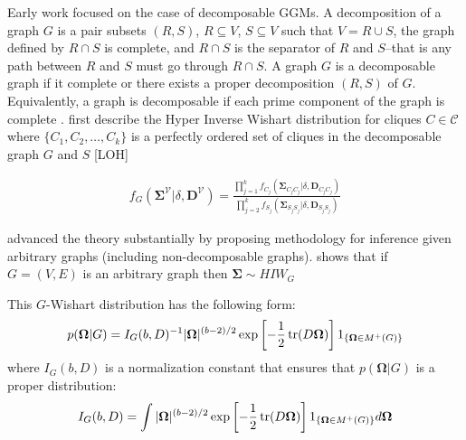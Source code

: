 Early work \cite{dawid1993} focused on the case of decomposable GGMs. A decomposition of a graph $G$ is a pair subsets $(R,S)$, $R\subseteq V$, $S\subseteq V$ such that $V=R \cup S$, the graph defined by $R \cap S$ is complete, and $R \cap S$ is the separator of $R$ and $S$--that is any path between $R$ and $S$ must go through $R \cap S$. A graph $G$ is a decomposable graph if it complete or there exists a proper decomposition $(R,S)$ of $G$. Equivalently, a graph is decomposable if each prime component of the graph is complete \cite{roverato2002}. \cite{dawid1993} first describe the Hyper Inverse Wishart distribution for cliques $C\in \mathcal{C}$ where $\{C_1,C_2, \hdots,C_k \}$ is a perfectly ordered set of cliques in the decomposable graph $G$ and $S$ [LOH]

\begin{align}
f_G(\boldsymbol{\Sigma}^{\mathcal{V}}|\delta,\textbf{D}^{\mathcal{V}})= \frac{\prod_{j=1}^k f_{C_j}(\boldsymbol{\Sigma}_{C_j C_j}|\delta,\textbf{D}_{C_j C_j})}{\prod_{j=2}^k f_{S_j}(\boldsymbol{\Sigma}_{S_j S_j}|\delta,\textbf{D}_{S_j S_j})}
\end{align}

\cite{roverato2002} advanced the theory substantially by proposing methodology for inference given arbitrary graphs (including non-decomposable graphs). \cite{roverato2002} shows that if $G=(V,E)$ is an arbitrary graph then $\boldsymbol{\Sigma} \sim HIW_G$

This $G$-Wishart distribution has the following form: 
\begin{align}
p(\boldsymbol{\Omega}|G)=I_G(b,D)^{-1}|\boldsymbol{\Omega}|^{(b-2)/2} \exp \left[-\frac{1}{2} \operatorname{tr}(D \boldsymbol{\Omega}) \right] 1_{ \{\boldsymbol{\Omega} \in M^+(G)\} }
\end{align}
where $I_G(b,D)$ is a normalization constant that ensures that $p(\boldsymbol{\Omega}|G)$ is a proper distribution:
\begin{align}
I_G(b,D)=\int |\boldsymbol{\Omega}|^{(b-2)/2} \exp \left[-\frac{1}{2} \operatorname{tr}(D \boldsymbol{\Omega}) \right] 1_{ \{\boldsymbol{\Omega} \in M^+(G)\} } d\boldsymbol{\Omega}
\end{align}